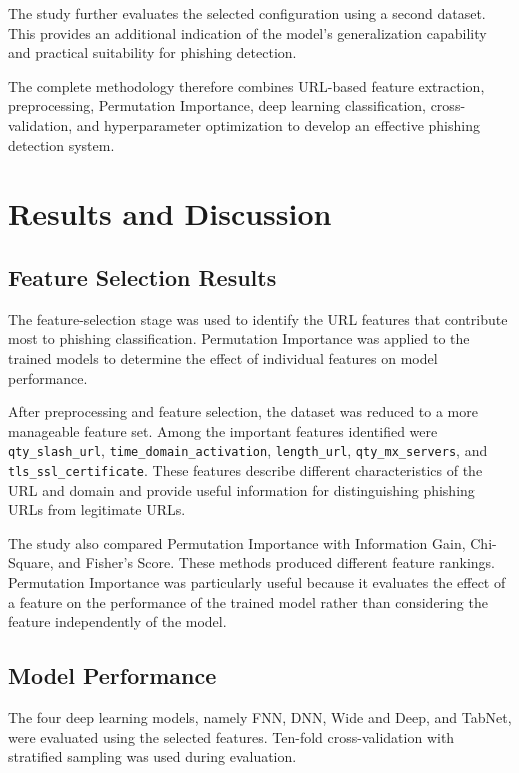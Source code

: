 \documentclass[12pt,a4paper]{report}
\begin{document}
The study further evaluates the selected configuration using a second dataset. This provides an additional indication of the model's generalization capability and practical suitability for phishing detection.

The complete methodology therefore combines URL-based feature extraction, preprocessing, Permutation Importance, deep learning classification, cross-validation, and hyperparameter optimization to develop an effective phishing detection system.


\chapter{Results and Discussion}

\section{Feature Selection Results}

The feature-selection stage was used to identify the URL features that contribute most to phishing classification. Permutation Importance was applied to the trained models to determine the effect of individual features on model performance.

After preprocessing and feature selection, the dataset was reduced to a more manageable feature set. Among the important features identified were \texttt{qty\_slash\_url}, \texttt{time\_domain\_activation}, \texttt{length\_url}, \texttt{qty\_mx\_servers}, and \texttt{tls\_ssl\_certificate}. These features describe different characteristics of the URL and domain and provide useful information for distinguishing phishing URLs from legitimate URLs.

The study also compared Permutation Importance with Information Gain, Chi-Square, and Fisher's Score. These methods produced different feature rankings. Permutation Importance was particularly useful because it evaluates the effect of a feature on the performance of the trained model rather than considering the feature independently of the model.

\section{Model Performance}

The four deep learning models, namely FNN, DNN, Wide and Deep, and TabNet, were evaluated using the selected features. Ten-fold cross-validation with stratified sampling was used during evaluation.
\end{document}
